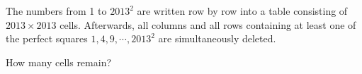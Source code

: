 The numbers from 1 to $ 2013^2 $ are written row by row into a table consisting of $ 2013 \times 2013 $ cells. Afterwards, all columns and all rows containing at least one of the perfect squares $ 1, 4, 9, \cdots, 2013^2 $ are simultaneously deleted.

How many cells remain?